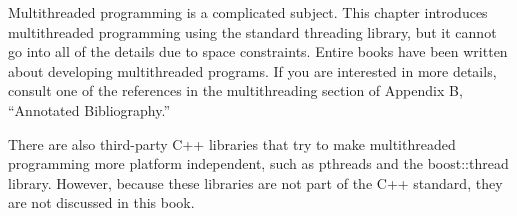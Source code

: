 Multithreaded programming is a complicated subject. This chapter introduces multithreaded programming using the standard threading library, but it cannot go into all of the details due to space constraints. Entire books have been written about developing multithreaded programs. If you are interested in more details, consult one of the references in the multithreading section of Appendix B, “Annotated Bibliography.”

There are also third-party C++ libraries that try to make multithreaded programming more platform independent, such as pthreads and the boost::thread library. However, because these libraries are not part of the C++ standard, they are not discussed in this book.





